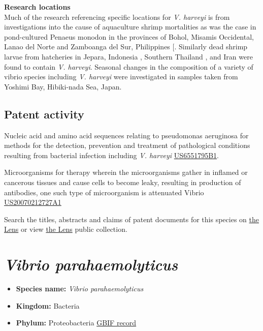 \documentclass[openany]{book}
\providecommand{\tightlist}{%
  \setlength{\itemsep}{0pt}\setlength{\parskip}{0pt}}
\theoremstyle{definition}
\theoremstyle{definition}
\theoremstyle{definition}
\theoremstyle{remark}
\begin{document}
\textbf{Research locations}\\
Much of the research referencing specific locations for \emph{V.
harveyi} is from investigations into the cause of aquaculture shrimp
mortalities as was the case in pond-cultured Penaeus monodon in the
provinces of Bohol, Misamis Occidental, Lanao del Norte and Zamboanga
del Sur, Philippines {[}\citet{Pena_2003}. Similarly dead shrimp larvae
from hatcheries in Jepara, Indonesia \citep{Prayitno_1995}, Southern
Thailand \citep{Ruangpan_1999}, and Iran \citep{Afsharnasab_2014} were
found to contain \emph{V. harveyi}. Seasonal changes in the composition
of a variety of vibrio species including \emph{V. harveyi} were
investigated in samples taken from Yoshimi Bay, Hibiki-nada Sea, Japan.

\hypertarget{patent-activity-8}{%
\subsection{Patent activity}\label{patent-activity-8}}

Nucleic acid and amino acid sequences relating to pseudomonas aeruginosa
for methods for the detection, prevention and treatment of pathological
conditions resulting from bacterial infection including \emph{V.
harveyi}
\href{https://www.lens.org/lens/patent/US_6551795_B1}{US6551795B1}.

Microorganisms for therapy wherein the microorganisms gather in inflamed
or cancerous tissues and cause cells to become leaky, resulting in
production of antibodies, one such type of microorganism is attenuated
Vibrio
\href{https://www.lens.org/lens/patent/US_2007_0212727_A1}{US20070212727A1}

Search the titles, abstracts and claims of patent documents for this
species on
\href{https://www.lens.org/lens/search?q=title:(\%22Vibrio\%20harveyi\%22)\%20OR\%20abstract:(\%22Vibrio\%20harveyi\%22)\%20OR\%20claims:(\%22Vibrio\%20harveyi\%22)\&l=en\&preview=true}{the
Lens} or view \href{https://www.lens.org/lens/collection/24872}{the
Lens} public collection.

\hypertarget{vibrio-parahaemolyticus}{%
\section{\texorpdfstring{\emph{Vibrio
parahaemolyticus}}{Vibrio parahaemolyticus}}\label{vibrio-parahaemolyticus}}

\begin{itemize}
\tightlist
\item
  \textbf{Species name:} \emph{Vibrio parahaemolyticus}
\item
  \textbf{Kingdom:} Bacteria\\
\item
  \textbf{Phylum:} Proteobacteria
  \href{https://www.gbif.org/species/5427673}{GBIF record}
\end{itemize}
\end{document}
